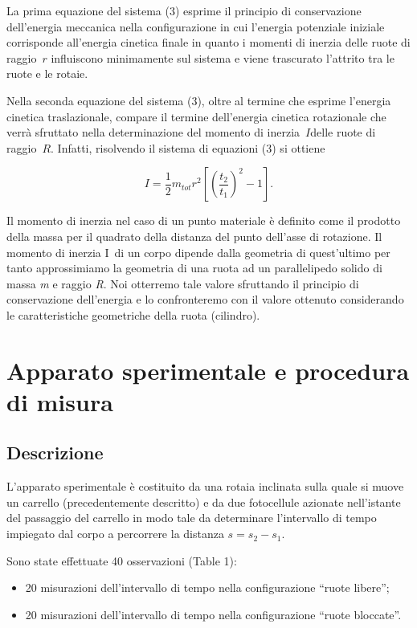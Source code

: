\documentclass[10pt,a4paper]{article}
\providecommand{\tightlist}{\setlength{\itemsep}{0pt}\setlength{\parskip}{0pt}}%
\begin{document}
La prima equazione del sistema (3) esprime il principio di conservazione
dell'energia meccanica nella configurazione in cui l'energia potenziale
iniziale corrisponde all'energia cinetica finale in quanto i momenti di
inerzia delle ruote di raggio~\(r\) influiscono minimamente
sul sistema e viene trascurato l'attrito tra le ruote e le rotaie.~

Nella seconda equazione del sistema (3), oltre al termine che esprime
l'energia cinetica traslazionale, compare il termine dell'energia
cinetica rotazionale che verrà sfruttato nella determinazione del
momento di inerzia~\(I\)delle ruote di
raggio~\(R\). Infatti, risolvendo il sistema di equazioni
(3) si ottiene

\[I=\frac{1}{2}m_{tot} r^2\left[\left(\frac{t_2}{t_1}\right)^2-1\right].\]

Il momento di inerzia nel caso di un punto materiale è definito come il
prodotto della massa per il quadrato della distanza del punto dell'asse
di rotazione. Il momento di inerzia I~di un corpo dipende dalla
geometria di quest'ultimo per tanto approssimiamo la geometria di una
ruota ad un parallelipedo solido di massa \emph{m} e raggio \emph{R}.
Noi otterremo tale valore sfruttando il principio di conservazione
dell'energia e lo confronteremo con il valore ottenuto considerando le
caratteristiche geometriche della ruota (cilindro).

\section*{Apparato sperimentale e procedura di
misura}

{\label{507351}}

\subsection*{Descrizione}

{\label{588451}}

L'apparato sperimentale è costituito da una rotaia inclinata sulla quale
si muove un carrello (precedentemente descritto) e da due fotocellule
azionate nell'istante del passaggio del carrello in modo tale da
determinare l'intervallo di tempo impiegato dal corpo a percorrere la
distanza \(s=s_2 - s_1\).

Sono state effettuate 40 osservazioni (Table 1):

\begin{itemize}
\tightlist
\item
  20 misurazioni dell'intervallo di tempo nella configurazione ``ruote
  libere'';
\item
  20 misurazioni dell'intervallo di tempo nella configurazione ``ruote
  bloccate''.
\end{itemize}
\end{document}
